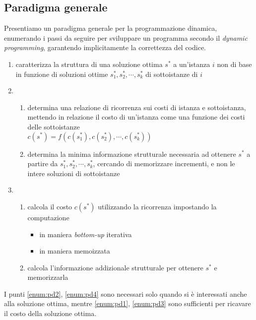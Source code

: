 \subsection{Paradigma generale}

Presentiamo un paradigma generale per la programmazione dinamica, enumerando i passi da seguire per sviluppare un programma secondo il \emph{dynamic programming}, garantendo implicitamente la correttezza del codice.

\begin{enumerate}
    \item caratterizza la struttura di una soluzione ottima $s^*$ a un'istanza $i$ non di base in funzione di soluzioni ottime $s_1^*, s_2^*, \cdots, s_k^*$ di sottoistanze di $i$
    \item
        \begin{enumerate}
            \item determina una relazione di ricorrenza sui costi di istanza e sottoistanza, mettendo in relazione il costo di un'istanza come una funzione dei costi delle sottoistanze \\ $c(s^*)=f\left(c(s_1^*),c(s_2^*),\cdots,c(s_k^*)\right)$
                \label{enum:pd1}
            \item determina la minima informazione strutturale necessaria ad ottenere $s^*$ a partire da $s_1^*, s_2^*, \cdots, s_k^*$, cercando di memorizzare incrementi, e non le intere soluzioni di sottoistanze
                \label{enum:pd2}
        \end{enumerate}
    \item
        \begin{enumerate}
            \item calcola il costo $c(s^*)$ utilizzando la ricorrenza impostando la computazione
                \begin{itemize}
                    \item in maniera \emph{bottom-up} iterativa
                    \item in maniera memoizzata
                \end{itemize}
                \label{enum:pd3}
            \item calcola l'informazione addizionale strutturale per ottenere $s^*$ e memorizzarla
                \label{enum:pd4}
        \end{enumerate}
\end{enumerate}

I punti \ref{enum:pd2}, \ref{enum:pd4} sono necessari solo quando si è interessati anche alla soluzione ottima, mentre \ref{enum:pd1}, \ref{enum:pd3} sono sufficienti per ricavare il costo della soluzione ottima.


